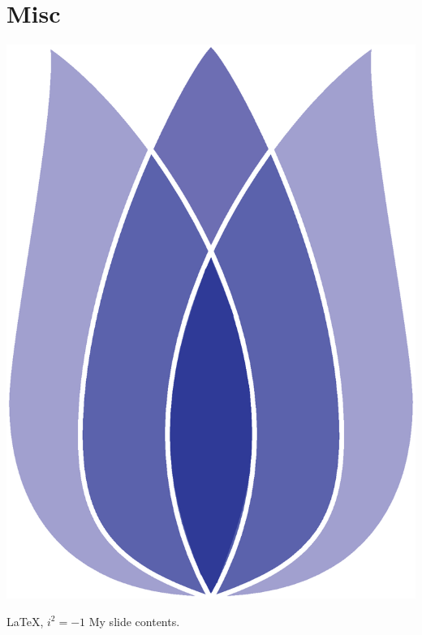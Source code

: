 \documentclass[
 size=12pt,
 paper=smartboard, %
 mode=present, %
 display=slides, %
style=tulip,
pauseslide,
fleqn,leqno,clock]{powerdot}
\begin{document}
\section{Misc}

\begin{emptyslide}{}
\centering
{}
\includegraphics[height=0.8\slideheight]{logos/tulip-logo.eps}
\end{emptyslide}


\begin{slide}[toc=,bm={LaTeX, i*i=-1}]{\color{red}\LaTeX, $i^2=-1$}
My slide contents.
\end{slide}
\end{document}
